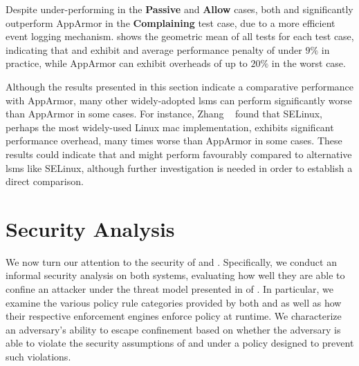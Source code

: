 Despite under-performing in the \textbf{Passive} and \textbf{Allow} cases, both \bpfbox{}
and \bpfcontain{} significantly outperform AppArmor in the \textbf{Complaining} test case,
due to a more efficient event logging mechanism.  shows the
geometric mean of all tests for each test case, indicating that \bpfbox{} and
\bpfcontain{} exhibit and average performance penalty of under $9\%$ in practice, while
AppArmor can exhibit overheads of up to $20\%$ in the worst case.

Although the results presented in this section indicate a comparative performance with
AppArmor, many other widely-adopted \glspl{lsm} can perform significantly worse than
AppArmor in some cases. For instance, Zhang \etal~\cite{zhang2021_lsm_file_overhead} found
that SELinux, perhaps the most widely-used Linux \gls{mac} implementation, exhibits
significant performance overhead, many times worse than AppArmor in some cases. These
results could indicate that \bpfbox{} and \bpfcontain{} might perform favourably compared
to alternative \glspl{lsm} like SELinux, although further investigation is needed in order
to establish a direct comparison.

\section{Security Analysis}%
\label{s:eval-security}

We now turn our attention to the security of \bpfbox{} and \bpfcontain. Specifically, we
conduct an informal security analysis on both systems, evaluating how well they are able
to confine an attacker under the threat model presented in  of
. In particular, we examine the various policy rule categories
provided by both \bpfbox{} and \bpfcontain{} as well as how their respective enforcement
engines enforce policy at runtime. We characterize an adversary's ability to escape
confinement based on whether the adversary is able to violate the security assumptions of
\bpfbox{} and \bpfcontain{} under a policy designed to prevent such violations.



